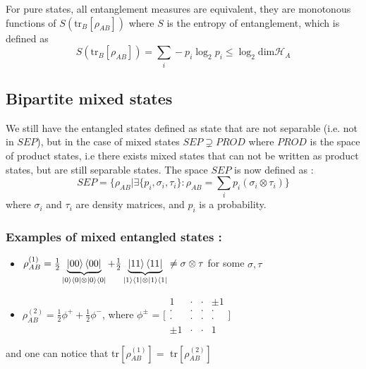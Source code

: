 \documentclass{article}
\begin{document}
For pure states, all entanglement measures are equivalent, they are monotonous
functions of $S(\text{tr}_B[\rho_{AB}])$ where $S$ is the entropy of
entanglement, which is defined as
\begin{equation}
    \label{entenglement-entropy}
    S(\text{tr}_B[\rho_{AB}]) =\sum_i -p_i \log_2 p_i \leq \log_2 \text{dim}\mathscr{H}_A
\end{equation}

\subsection{Bipartite mixed states}
We still have the entangled states defined as state that are not separable
(i.e. not in $SEP$), but in the case of mixed states $SEP \supsetneq PROD$ where
$PROD$ is the space of product states, i.e there exists mixed states that can not be
written as product states, but are still separable states.
The space $SEP$ is now defined as :
\begin{equation}
    \label{def-mixed-state-sep}
    SEP = \big\{\rho_{AB} | \exists \{p_i, \sigma_i, \tau_i\} : \rho_{AB} = \sum_i p_i (\sigma_i \otimes \tau_i)  \big\}
\end{equation}
where $\sigma_i$ and $\tau_i$ are density matrices, and $p_i$ is a probability.
\subsubsection*{Examples of mixed entangled states :}
\begin{itemize}[label=-]
    \item $\rho_{AB}^{(1)} =
    \frac{1}{2}\underbrace{\ket{00}\bra{00}}_{\ket{0}\bra{0}\otimes\ket{0}\bra{0}}
    +\frac{1}{2}\underbrace{\ket{11}\bra{11}}_{\ket{1}\bra{1}\otimes\ket{1}\bra{1}}
    \neq\sigma \otimes \tau $ for some $\sigma, \tau$
    \item $\rho_{AB}^{(2)} = \frac{1}{2} \phi^+ + \frac{1}{2} \phi^-$, where
    $\phi^\pm$ = $\Biggl[\begin{smallmatrix} 1 & \cdot & \cdot & \pm 1 \\
       \cdot & \cdot & \cdot & \cdot \\
       \cdot & \cdot & \cdot & \cdot \\
       \pm 1 & \cdot & \cdot & 1 \end{smallmatrix} \Biggr]$
\end{itemize}
and one can notice that tr$[\rho_{AB}^{(1)}] = $ tr$[\rho_{AB}^{(2)}]$
\end{document}
